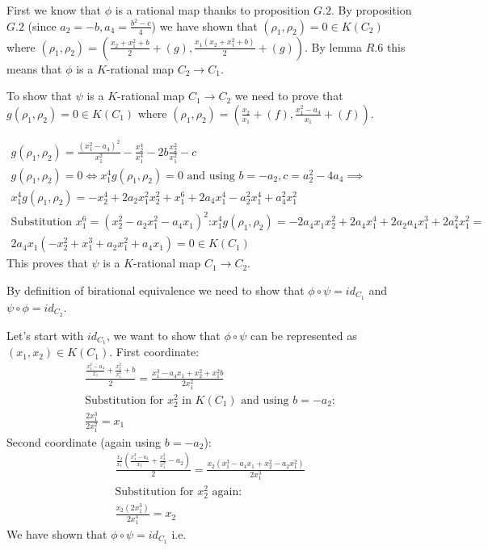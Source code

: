 \documentclass[12pt, a4paper]{article}
\begin{document}
First we know that $\phi$ is a rational map thanks to proposition $G.2$. By proposition $G.2$ (since $a_2 = -b, a_4 = \frac{b^2-c}{4}$) we have shown that $(\rho_1,\rho_2) = 0 \in K(C_2)$ where $(\rho_1,\rho_2) = \left(\frac{x_2+x_1^2+b}{2} + (g), \frac{x_1(x_2+x_1^2+b)}{2} + (g)\right)$. By lemma $R.6$ this means that $\phi$ is a $K$-rational map $C_2 \rightarrow C_1$.

To show that $\psi$ is a $K$-rational map $C_1 \rightarrow C_2$ we need to prove that $g(\rho_1, \rho_2) = 0 \in K(C_1)$ where $(\rho_1, \rho_2) = \left( \frac{x_2}{x_1} + (f), \frac{x_1^2-a_4}{x_1} + (f)\right)$.

\begin{gather*}
g(\rho_1, \rho_2) = \frac{(x_1^2-a_4)^2}{x_1^2} - \frac{x_2^4}{x_1^4} - 2b\frac{x_2^2}{x_1^2} - c\\
g(\rho_1, \rho_2) = 0 \iff x_1^4g(\rho_1, \rho_2) = 0 \text{ and using $b=-a_2, c = a_2^2-4a_4$}\implies\\
x_1^4g(\rho_1, \rho_2) = -x_2^4 + 2a_2x_1^2x_2^2+x_1^6+2a_4x_1^4-a_2^2x_1^4+a_4^2x_1^2\\
\text{Substitution $x_1^6 = (x_2^2-a_2x_1^2-a_4x_1)^2$:}
x_1^4g(\rho_1, \rho_2) = -2a_4x_1x_2^2+2a_4x_1^4+2a_2a_4x_1^3+2a_4^2x_1^2 = \\
2a_4x_1(-x_2^2+x_1^3+a_2x_1^2+a_4x_1) = 0 \in K(C_1)
\end{gather*}
This proves that $\psi$ is a $K$-rational map $C_1 \rightarrow C_2$.


By definition of birational equivalence we need to show that $\phi \circ \psi = id_{C_1}$ and $\psi \circ \phi = id_{C_2}$.

Let's start with $id_{C_1}$, we want to show that $\phi \circ \psi$ can be represented as $(x_1, x_2) \in K(C_1)$. First coordinate:
\begin{gather*}
\frac{\frac{x_1^2-a_4}{x_1}+\frac{x_2^2}{x_1^2}+b}{2} = \frac{x_1^3-a_4x_1+x_2^2+x_1^2b}{2x_1^2}\\
\text{Substitution for $x_2^2$ in $K(C_1)$ and using $b=-a_2$:}\\
\frac{2x_1^3}{2x_1^2} = x_1
\end{gather*}
Second coordinate (again using $b=-a_2$):
\begin{gather*}
\frac{\frac{x_2}{x_1}\left(\frac{x_1^2-a_4}{x_1} + \frac{x_2^2}{x_1^2} - a_2 \right)}{2} = \frac{x_2(x_1^3-a_4x_1+x_2^2-a_2x_1^2)}{2x_1^3}\\
\text{Substitution for $x_2^2$ again:}\\
\frac{x_2(2x_1^3)}{2x_1^3} = x_2
\end{gather*}
We have shown that $\phi \circ \psi = id_{C_1}$ i.e. 
\end{document}
